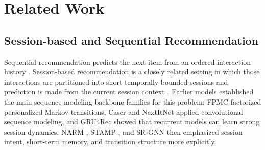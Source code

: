 \documentclass[sigconf,review,anonymous]{acmart}
\begin{document}


\section{Related Work}
\label{sec:related}

\subsection{Session-based and Sequential Recommendation}
Sequential recommendation predicts the next item from an ordered interaction history \cite{wang2019seqsurvey}. Session-based recommendation is a closely related setting in which those interactions are partitioned into short temporally bounded sessions and prediction is made from the current session context \cite{jannach2022sessions,wang2021sessionsurvey}. Earlier models established the main sequence-modeling backbone families for this problem: FPMC \cite{rendle2010fpmc} factorized personalized Markov transitions, Caser \cite{tang2018caser} and NextItNet \cite{yuan2019nextitnet} applied convolutional sequence modeling, and GRU4Rec \cite{hidasi2016gru4rec} showed that recurrent models can learn strong session dynamics. NARM \cite{li2017narm}, STAMP \cite{liu2018stamp}, and SR-GNN \cite{wu2019srgnn} then emphasized session intent, short-term memory, and transition structure more explicitly.
\end{document}
